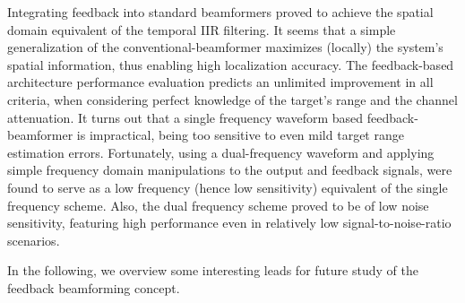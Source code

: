 Integrating feedback into standard beamformers proved to achieve the spatial domain equivalent of the temporal IIR filtering.
It seems that a simple generalization of the conventional-beamformer maximizes (locally) the system's spatial information, thus enabling high localization accuracy.
The feedback-based architecture performance evaluation predicts an unlimited improvement in all criteria, when considering perfect knowledge of the target's range and the channel attenuation.
It turns out that a single frequency waveform based feedback-beamformer is impractical, being too sensitive to even mild target range estimation errors.
Fortunately, using a dual-frequency waveform and applying simple frequency domain manipulations to the output and feedback signals, were found to serve as a low frequency (hence low sensitivity) equivalent of the single frequency scheme.
Also, the dual frequency scheme proved to be of low noise sensitivity, featuring high performance even in relatively low signal-to-noise-ratio scenarios.
\par In the following, we overview some interesting leads for future study of the feedback beamforming concept.